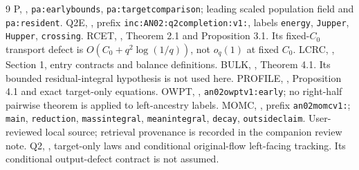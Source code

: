 \documentclass[11pt]{article}
\theoremstyle{remark}\newtheorem{remark}[theorem]{Remark}
\begin{document}
\begin{thebibliography}{9}\small
{} P, ,
\texttt{pa:earlybounds}, \texttt{pa:targetcomparison};
leading scaled population field and \texttt{pa:resident}.
 Q2E, ,
prefix \texttt{inc:AN02:q2completion:v1:},
labels \texttt{energy}, \texttt{Jupper}, \texttt{Hupper}, \texttt{crossing}.
 RCET,
,
Theorem 2.1 and Proposition 3.1. Its fixed-$C_0$ transport defect
is $O(C_0+q^2\log(1/q))$, not $o_q(1)$ at fixed $C_0$.
 LCRC, ,
Section 1, entry contracts and balance definitions.
 BULK,
,
Theorem 4.1. Its bounded residual-integral hypothesis is not used here.
 PROFILE,
,
Proposition 4.1 and exact target-only equations.
 OWPT, ,
\texttt{an02owptv1:early}; no right-half pairwise theorem is
applied to left-ancestry labels.
 MOMC,
,
prefix \texttt{an02momcv1:}; \texttt{main}, \texttt{reduction},
\texttt{massintegral}, \texttt{meanintegral}, \texttt{decay},
\texttt{outsideclaim}. User-reviewed local source; retrieval
provenance is recorded in the companion review note.
 Q2, ,
target-only laws and conditional original-flow left-facing tracking.
Its conditional output-defect contract is not assumed.
\end{thebibliography}
\end{document}
